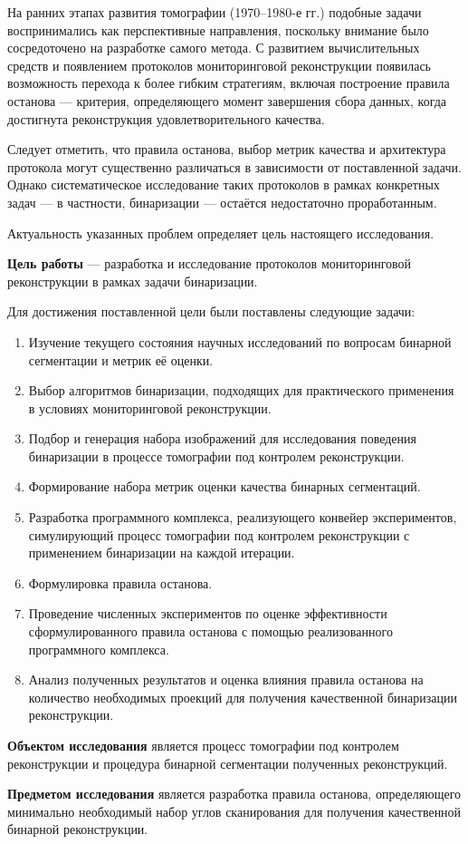 На ранних этапах развития томографии (1970–1980-е гг.) подобные задачи воспринимались как перспективные направления, поскольку внимание было сосредоточено на разработке самого метода. С развитием вычислительных средств и появлением протоколов мониторинговой реконструкции появилась возможность перехода к более гибким стратегиям, включая построение правила останова — критерия, определяющего момент завершения сбора данных, когда достигнута реконструкция удовлетворительного качества.

Следует отметить, что правила останова, выбор метрик качества и архитектура протокола могут существенно различаться в зависимости от поставленной задачи. Однако систематическое исследование таких протоколов в рамках конкретных задач — в частности, бинаризации — остаётся недостаточно проработанным.

Актуальность указанных проблем определяет цель настоящего исследования. 

\textbf{Цель работы} — разработка и исследование протоколов мониторинговой реконструкции в рамках задачи бинаризации.

Для достижения поставленной цели были поставлены следующие задачи:

\begin{enumerate}
    \item Изучение текущего состояния научных исследований по вопросам бинарной сегментации и метрик её оценки.
    \item Выбор алгоритмов бинаризации, подходящих для практического применения в условиях мониторинговой реконструкции.
    \item Подбор и генерация набора изображений для исследования поведения бинаризации в процессе томографии под контролем реконструкции.
    \item Формирование набора метрик оценки качества бинарных сегментаций.
    \item Разработка программного комплекса, реализующего конвейер экспериментов, симулирующий процесс томографии под контролем реконструкции с применением бинаризации на каждой итерации.
    \item Формулировка правила останова.
    \item Проведение численных экспериментов по оценке эффективности сформулированного правила останова с помощью реализованного программного комплекса.
    \item Анализ полученных результатов и оценка влияния правила останова на количество необходимых проекций для получения качественной бинаризации реконструкции.
\end{enumerate}

\textbf{Объектом исследования} является процесс томографии под контролем реконструкции и процедура бинарной сегментации полученных реконструкций.

\textbf{Предметом исследования} является разработка правила останова, определяющего минимально необходимый набор углов сканирования для получения качественной бинарной реконструкции.
